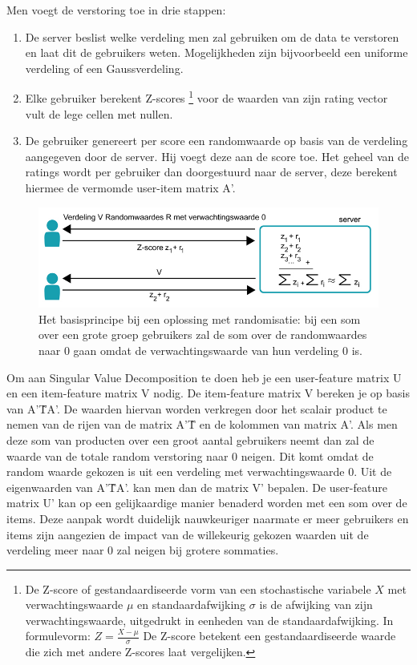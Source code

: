 Men voegt de verstoring toe in drie stappen:
\begin{enumerate}
\item De server beslist welke verdeling men zal gebruiken om de data te verstoren en laat dit de gebruikers weten. Mogelijkheden zijn bijvoorbeeld een uniforme verdeling of een Gaussverdeling.
\item Elke gebruiker berekent Z-scores \footnote{De Z-score of gestandaardiseerde vorm van een stochastische variabele $X$ met verwachtingswaarde $\mu$ en standaardafwijking $\sigma$ is de afwijking van zijn verwachtingswaarde, uitgedrukt in eenheden van de standaardafwijking. In formulevorm:
$Z=\frac{X-\mu}{\sigma}$
De Z-score betekent een gestandaardiseerde waarde die zich met andere Z-scores laat vergelijken.

} voor de waarden van zijn rating vector vult de lege cellen met nullen.
\item De gebruiker genereert per score een randomwaarde op basis van de verdeling aangegeven door de server. Hij voegt deze aan de score toe. Het geheel van de ratings wordt per gebruiker dan doorgestuurd naar de server, deze berekent hiermee de vermomde user-item matrix A’.
\end{enumerate}
\begin{figure}[htpb]   
    \label{Figuur::randomisatiefig}      
  \begin{center}    
 \includegraphics[scale=0.5]{fig/randomisatie}    
  \end{center}   
  \caption{Het basisprincipe bij een oplossing met randomisatie: bij een som over een grote groep gebruikers zal de som over de randomwaardes naar 0 gaan omdat de verwachtingswaarde van hun verdeling 0 is.}  
   \end{figure}
Om aan Singular Value Decomposition te doen heb je een user-feature matrix U en een item-feature matrix V nodig. De item-feature matrix V bereken je op basis van A’\^TA’. De waarden hiervan worden verkregen door het scalair product te nemen van de rijen van de matrix A’\^T en de kolommen van matrix A’. Als men deze som van producten over een groot aantal gebruikers neemt dan zal de waarde van de totale random verstoring naar 0 neigen. Dit komt omdat de random waarde gekozen is uit een verdeling met verwachtingswaarde 0. Uit de eigenwaarden van A’\^TA’. kan men dan de matrix V’ bepalen. De user-feature matrix U’ kan op een gelijkaardige manier benaderd worden met een som over de items. Deze aanpak wordt duidelijk nauwkeuriger naarmate er meer gebruikers en items zijn aangezien de impact van de willekeurig gekozen waarden uit de verdeling meer naar 0 zal neigen bij grotere sommaties.

